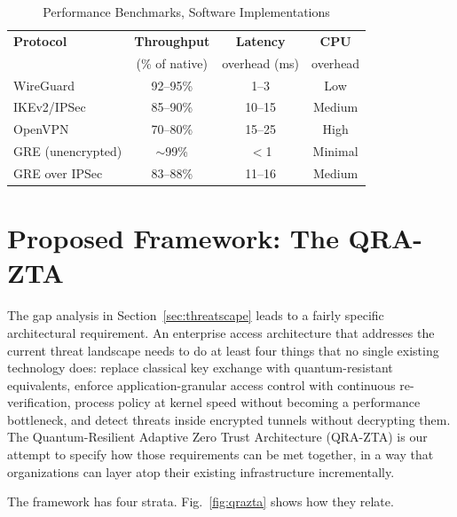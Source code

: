 \documentclass[conference]{IEEEtran}
\begin{document}
\begin{table}[htbp]
\caption{Performance Benchmarks, Software Implementations}
\label{tab:perf}
\centering
\renewcommand{\arraystretch}{1.2}
\begin{tabular}{lccc}
\toprule
\textbf{Protocol} & \textbf{Throughput} & \textbf{Latency} & \textbf{CPU} \\
                  & (\% of native) & overhead (ms) & overhead \\
\midrule
WireGuard         & 92--95\%  & 1--3    & Low \\
IKEv2/IPSec       & 85--90\%  & 10--15  & Medium \\
OpenVPN           & 70--80\%  & 15--25  & High \\
GRE (unencrypted) & $\sim$99\%& $<$1    & Minimal \\
GRE over IPSec    & 83--88\%  & 11--16  & Medium \\
\bottomrule
\end{tabular}
\end{table}

\section{Proposed Framework: The QRA-ZTA}
\label{sec:framework}

The gap analysis in Section~\ref{sec:threatscape} leads to a
fairly specific architectural requirement. An enterprise access
architecture that addresses the current threat landscape needs
to do at least four things that no single existing technology
does: replace classical key exchange with quantum-resistant
equivalents, enforce application-granular access control with
continuous re-verification, process policy at kernel speed
without becoming a performance bottleneck, and detect threats
inside encrypted tunnels without decrypting them. The
Quantum-Resilient Adaptive Zero Trust Architecture (QRA-ZTA)
is our attempt to specify how those requirements can be met
together, in a way that organizations can layer atop their
existing infrastructure incrementally.

The framework has four strata. Fig.~\ref{fig:qrazta} shows
how they relate.
\end{document}
